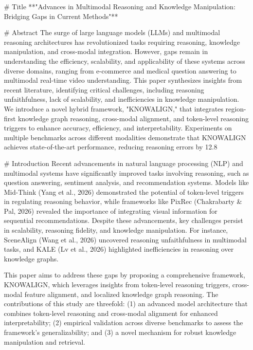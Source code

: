 # Title
**"Advances in Multimodal Reasoning and Knowledge Manipulation: Bridging Gaps in Current Methods"**

# Abstract
The surge of large language models (LLMs) and multimodal reasoning architectures has revolutionized tasks requiring reasoning, knowledge manipulation, and cross-modal integration. However, gaps remain in understanding the efficiency, scalability, and applicability of these systems across diverse domains, ranging from e-commerce and medical question answering to multimodal real-time video understanding. This paper synthesizes insights from recent literature, identifying critical challenges, including reasoning unfaithfulness, lack of scalability, and inefficiencies in knowledge manipulation. We introduce a novel hybrid framework, "KNOWALIGN," that integrates region-first knowledge graph reasoning, cross-modal alignment, and token-level reasoning triggers to enhance accuracy, efficiency, and interpretability. Experiments on multiple benchmarks across different modalities demonstrate that KNOWALIGN achieves state-of-the-art performance, reducing reasoning errors by 12.8%

# Introduction 
Recent advancements in natural language processing (NLP) and multimodal systems have significantly improved tasks involving reasoning, such as question answering, sentiment analysis, and recommendation systems. Models like Mid-Think (Yang et al., 2026) demonstrated the potential of token-level triggers in regulating reasoning behavior, while frameworks like PixRec (Chakrabarty & Pal, 2026) revealed the importance of integrating visual information for sequential recommendations. Despite these advancements, key challenges persist in scalability, reasoning fidelity, and knowledge manipulation. For instance, SceneAlign (Wang et al., 2026) uncovered reasoning unfaithfulness in multimodal tasks, and KALE (Lv et al., 2026) highlighted inefficiencies in reasoning over knowledge graphs. 

This paper aims to address these gaps by proposing a comprehensive framework, KNOWALIGN, which leverages insights from token-level reasoning triggers, cross-modal feature alignment, and localized knowledge graph reasoning. The contributions of this study are threefold: (1) an advanced model architecture that combines token-level reasoning and cross-modal alignment for enhanced interpretability; (2) empirical validation across diverse benchmarks to assess the framework's generalizability; and (3) a novel mechanism for robust knowledge manipulation and retrieval.

